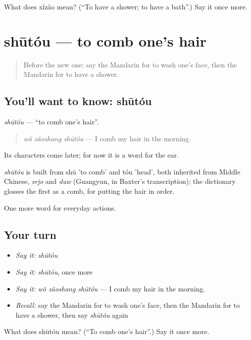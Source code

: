 \begin{tcolorbox}[breakable,colback=teal!4,colframe=teal!35!black,title={Before you move on}]
What does xǐzǎo mean? (\textquotedblleft{}To have a shower; to have a bath\textquotedblright{}.) Say it once more.
\end{tcolorbox}
\section[shūtóu]{shūtóu — to comb one's hair}

\label{lesson:ZH-C99-shutou}



\begin{quote}
Before the new one: say the Mandarin for to wash one's face, then the Mandarin for to have a shower.
\end{quote}

\subsection*{You'll want to know: shūtóu}
\emph{shūtóu} — \textquotedblleft{}to comb one's hair\textquotedblright{}.

\begin{quote}
\emph{wǒ zǎoshang shūtóu} — I comb my hair in the morning.
\end{quote}

Its characters come later; for now it is a word for the ear.

\begin{cousinweb}
\emph{shūtóu} is built from shū 'to comb' and tóu 'head', both inherited from Middle Chinese, \emph{srjo} and \emph{duw} (Guangyun, in Baxter's transcription); the dictionary glosses the first as a comb, for putting the hair in order.
\end{cousinweb}

\begin{grammarlens}[title={What you've built}]
One more word for everyday actions.
\end{grammarlens}

\subsection*{Your turn}
\begin{itemize}
\raggedright
  \item \emph{Say it:} \emph{shūtóu}
  \item \emph{Say it:} \emph{shūtóu}, once more
  \item \emph{Say it:} \emph{wǒ zǎoshang shūtóu} — I comb my hair in the morning.
  \item \emph{Recall:} say the Mandarin for to wash one's face, then the Mandarin for to have a shower, then say \emph{shūtóu} again
\end{itemize}

\begin{tcolorbox}[breakable,colback=teal!4,colframe=teal!35!black,title={Before you move on}]
What does shūtóu mean? (\textquotedblleft{}To comb one's hair\textquotedblright{}.) Say it once more.
\end{tcolorbox}
